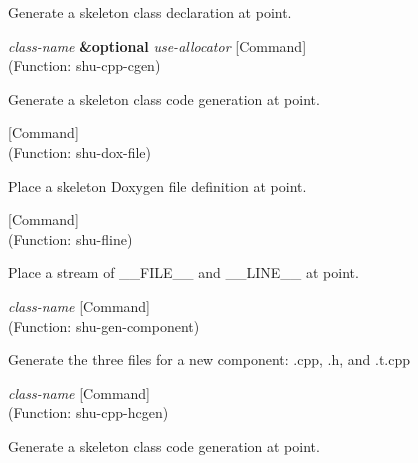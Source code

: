 \begin{doc-string}
Generate a skeleton class declaration at point.
\end{doc-string}

\vspace{1em}
\noindent
{}
\usebox{\funcname}\emph{class-name} \textbf{\&optional} \emph{use-allocator}
 \hfill [Command]\\%
 (Function: shu-cpp-cgen)

\begin{doc-string}
Generate a skeleton class code generation at point.
\end{doc-string}

\vspace{1em}
\noindent
{}
\usebox{\funcname}
 \hfill [Command]\\%
 (Function: shu-dox-file)

\begin{doc-string}
Place a skeleton Doxygen file definition at point.
\end{doc-string}

\vspace{1em}
\noindent
{}
\usebox{\funcname}
 \hfill [Command]\\%
 (Function: shu-fline)

\begin{doc-string}
Place a stream of \_\_FILE\_\_ and \_\_LINE\_\_ at point.
\end{doc-string}

\vspace{1em}
\noindent
{}
\usebox{\funcname}\emph{class-name}
 \hfill [Command]\\%
 (Function: shu-gen-component)

\begin{doc-string}
Generate the three files for a new component: .cpp, .h, and .t.cpp
\end{doc-string}

\vspace{1em}
\noindent
{}
\usebox{\funcname}\emph{class-name}
 \hfill [Command]\\%
 (Function: shu-cpp-hcgen)

\begin{doc-string}
Generate a skeleton class code generation at point.
\end{doc-string}

